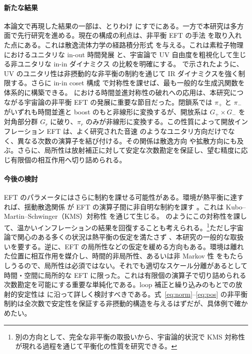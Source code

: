 \documentclass[a4paper,11pt]{ltjsarticle}
\numberwithin{equation}{section}
\def\pir{\pi_{r}}
\newcommand{\Eqs}[1]{Eqs.~(\ref{#1})}
\renewcommand{\Eqs}[1]{式~\eqref{#1}}
\begin{document}
\paragraph{新たな結果} 本論文で再現した結果の一部は、とりわけ \cite{LopezNacir:2011kk,Hongo:2018ant,Creminelli:2023aly} にすでにある。一方で本研究は多方面で先行研究を進める。現在の構成の利点は、非平衡 EFT の手法 \cite{Liu:2018kfw} を取り入れた点にある。これは散逸流体力学の経路積分形式 \cite{Crossley:2015evo, Glorioso:2016gsa} を与える。これは素粒子物理におけるユニタリな in-out 時間発展 \cite{Donath:2024utn} と、宇宙論で UV 自由度を粗視化して生じる非ユニタリな in-in ダイナミクス \cite{Burgess:2022rdo, Colas:2023wxa} の比較を明確にする。\cite{Crossley:2015evo, Glorioso:2016gsa, Liu:2018kfw} で示されたように、UV のユニタリ性は非摂動的な非平衡の制約を通じて IR ダイナミクスを強く制限する。さらに in-in coset 構成 \cite{Akyuz:2023lsm} で対称性を課せば、最も一般的な生成汎関数を体系的に構築できる。\cite{Hongo:2018ant} における時間並進対称性の破れへの応用は、本研究につながる宇宙論の非平衡 EFT \cite{Ota:2024mps} の発展に重要な節目だった。閉鎖系では $\pi_+$ と $\pi_-$ がいずれも時間並進と boost のもと非線形に変換するが、開放系は $G_+\times G_-$ を対角部分群 $G_r$ に破り、$\pir$ のみが非線形に変換する。この性質によって開放インフレーション EFT は、よく研究された音速 \cite{Cheung:2007st} のようなユニタリ方向だけでなく、異なる次数の演算子を結び付ける。その関係は散逸方向 \cite{LopezNacir:2011kk} や拡散方向にも及ぶ。さらに、局所性は放射補正に対して安定な次数勘定を保証し、望む精度に応じ有限個の相互作用へ切り詰められる。

\paragraph{今後の検討} EFT のパラメータにはさらに制約を課せる可能性がある。環境が熱平衡に達すれば、揺動散逸関係 \cite{Kubo:1966fyg} が EFT の演算子間に非自明な制約を課す \cite{Hongo:2018ant, Ota:2024mps}。これは Kubo--Martin--Schwinger（KMS）対称性 \cite{Crossley:2015evo, Glorioso:2016gsa, Glorioso:2017fpd} を通じて生じる。\cite{Ota:2024mps} のようにこの対称性を課して、温かいインフレーションの結果を回復することも考えられる。\footnote{別の方向として、完全な非平衡の取扱いから、宇宙論的状況で KMS 対称性が現れる過程を通じて平衡化の性質を研究できる。}ただし宇宙論で関心のある多くの状況は熱平衡の仮定を満たさず \cite{Colas:2022hlq}、本研究の一般的な取扱いを要する。逆に、EFT の局所性などの仮定を緩める方向もある。環境は離れた位置に相互作用を媒介し、時間的非局所性、あるいは非 Markov 性 \cite{Colas:2022kfu} をもたらしうるので、局所性は必須ではない。それでも適切なスケール分離があるとして時間・空間に局所的な EFT に限った。これは有限個の演算子で切り詰められる次数勘定を可能にする重要な単純化である。loop 補正と繰り込みのもとでの放射的安定性は \cite{Adshead:2017srh,Grall:2020tqc} に沿って詳しく検討すべきである。\Eqs{eq:norm}--\eqref{eq:pos} の非平衡制約は全次数で安定性を保証する非摂動的構造を与えるはずだが、具体例で確かめたい。
\end{document}
